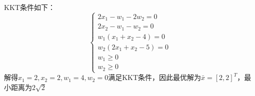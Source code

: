 \documentclass[a4paper]{article}
\begin{document}
KKT条件如下：
\begin{equation}
\left\{
\begin{array}{c}
2x_1-w_1-2w_2=0 \\
2x_2-w_1-w_2=0 \\
w_1(x_1+x_2-4)=0 \\
w_2(2x_1+x_2-5)=0 \\
w_1\ge 0 \\
w_2\ge 0
\end{array}
\right.
\end{equation}
解得$x_1=2,x_2=2,w_1=4,w_2=0$满足KKT条件，因此最优解为$\bar{x}=[2,2]^T$，最小距离为$2\sqrt{2}$
\end{document}
